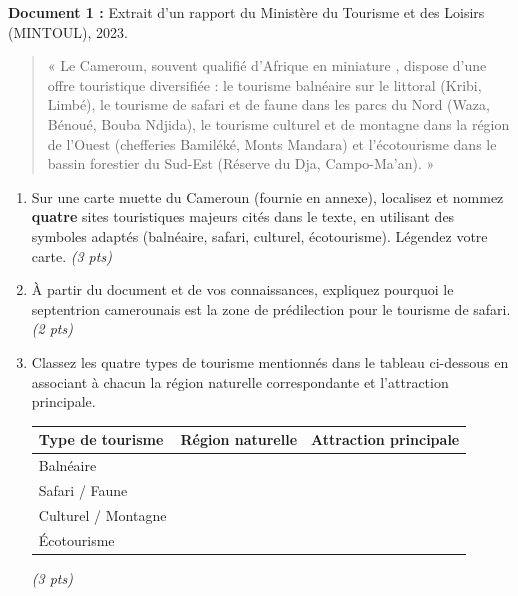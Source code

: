 \documentclass[11pt]{article}
\begin{document}
\begin{exercice}
\textbf{Document 1 :} Extrait d'un rapport du Ministère du Tourisme et des Loisirs (MINTOUL), 2023.
\begin{quote}
« Le Cameroun, souvent qualifié d'\og Afrique en miniature \fg{}, dispose d'une offre touristique diversifiée : le tourisme balnéaire sur le littoral (Kribi, Limbé), le tourisme de safari et de faune dans les parcs du Nord (Waza, Bénoué, Bouba Ndjida), le tourisme culturel et de montagne dans la région de l'Ouest (chefferies Bamiléké, Monts Mandara) et l'écotourisme dans le bassin forestier du Sud-Est (Réserve du Dja, Campo-Ma'an). »
\end{quote}

\begin{enumerate}
    \item Sur une carte muette du Cameroun (fournie en annexe), localisez et nommez \textbf{quatre} sites touristiques majeurs cités dans le texte, en utilisant des symboles adaptés (balnéaire, safari, culturel, écotourisme). Légendez votre carte. \textit{(3 pts)}
    \item À partir du document et de vos connaissances, expliquez pourquoi le septentrion camerounais est la zone de prédilection pour le tourisme de safari. \textit{(2 pts)}
    \item Classez les quatre types de tourisme mentionnés dans le tableau ci-dessous en associant à chacun la région naturelle correspondante et l'attraction principale.
    \begin{center}
    \begin{tabular}{|l|c|c|}
    \hline
    \textbf{Type de tourisme} & \textbf{Région naturelle} & \textbf{Attraction principale} \\ \hline
    Balnéaire & & \\ \hline
    Safari / Faune & & \\ \hline
    Culturel / Montagne & & \\ \hline
    Écotourisme & & \\ \hline
    \end{tabular}
    \end{center}
    \textit{(3 pts)}
\end{enumerate}
\end{exercice}
\end{document}
